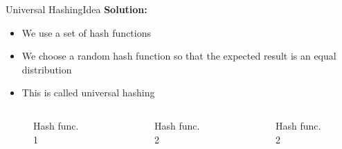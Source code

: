 \begin{frame}{Universal Hashing}{Idea}
  \textbf{Solution:}
  \begin{itemize}
    \item
      We use a set of hash functions
    \item
      We choose a random hash function so that the expected result is an equal
      distribution
    \item
      This is called {\color{Mittel-Blau}universal hashing}
  \end{itemize}
  \begin{columns}
    \begin{column}{0.33\linewidth}
      \begin{figure}[!h]
        \begin{adjustbox}{height=0.8\linewidth}
          
        \end{adjustbox}
        \caption{Hash func. 1}
        \label{fig:universal_hashing:hash_function_crossing}
      \end{figure}
    \end{column}
    \begin{column}{0.33\linewidth}
      \begin{figure}[!h]
        \begin{adjustbox}{height=0.8\linewidth}
          
        \end{adjustbox}
        \caption{Hash func. 2}
        \label{fig:universal_hashing:hash_function_normal}
      \end{figure}
    \end{column}
    \begin{column}{0.33\linewidth}
      \begin{figure}[!h]
        \begin{adjustbox}{height=0.8\linewidth}
          
        \end{adjustbox}
        \caption{Hash func. 2}
        \label{fig:universal_hashing:hash_function_colliding}
      \end{figure}
    \end{column}
  \end{columns}
\end{frame}


